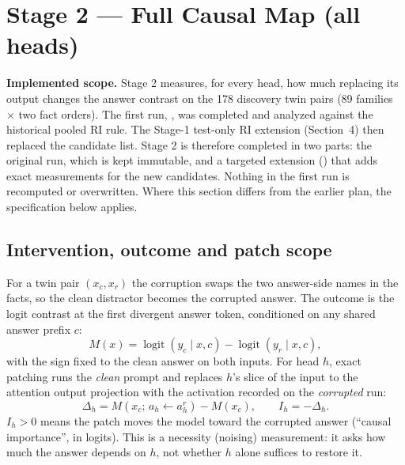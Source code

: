 
\section{Stage 2 --- Full Causal Map (all heads)}
\textbf{Implemented scope.} Stage 2 measures, for every head, how much replacing its output changes the answer contrast on the 178 discovery twin pairs (89 families $\times$ two fact orders). The first run, , was completed and analyzed against the historical pooled RI rule. The Stage-1 test-only RI extension (Section~4) then replaced the candidate list. Stage 2 is therefore completed in two parts: the original run, which is kept immutable, and a targeted extension () that adds exact measurements for the new candidates. Nothing in the first run is recomputed or overwritten. Where this section differs from the earlier plan, the specification below applies.

\subsection{Intervention, outcome and patch scope}
For a twin pair $(x_c, x_r)$ the corruption swaps the two answer-side names in the facts, so the clean distractor becomes the corrupted answer. The outcome is the logit contrast at the first divergent answer token, conditioned on any shared answer prefix $c$:
\begin{equation}
M(x)=\operatorname{logit}(y_c\mid x,c)-\operatorname{logit}(y_r\mid x,c),
\end{equation}
with the sign fixed to the clean answer on both inputs. For head $h$, exact patching runs the \emph{clean} prompt and replaces $h$'s slice of the input to the attention output projection with the activation recorded on the \emph{corrupted} run:
\begin{equation}
\Delta_h = M\!\left(x_c;\, a_h \leftarrow a_h^{r}\right) - M(x_c), \qquad I_h = -\Delta_h .
\end{equation}
$I_h>0$ means the patch moves the model toward the corrupted answer (``causal importance'', in logits). This is a necessity (noising) measurement: it asks how much the answer depends on $h$, not whether $h$ alone suffices to restore it.

